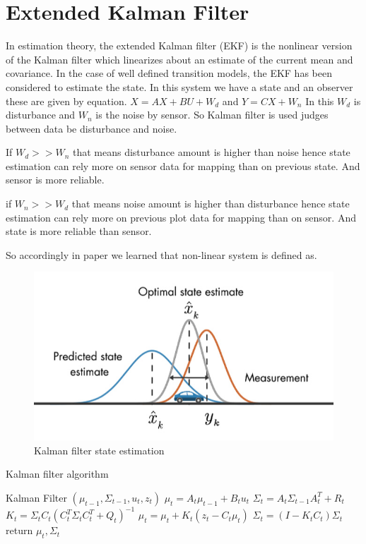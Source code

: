 \section{Extended Kalman Filter}
\label{ekf_section}

In estimation theory, the extended Kalman filter (EKF) is the nonlinear version of the Kalman filter which linearizes about an estimate of the current mean and covariance. In the case of well defined transition models, the EKF has been considered to estimate the state. In this system we have a state and an observer these are given by equation.
$ X=AX +BU + W_d $  and $ Y=CX + W_n $
In this $ W_d $ is disturbance and $ W_n $ is the noise by sensor.
So Kalman filter is used judges between data be disturbance and noise.


If $W_d >> W_n$ that means disturbance amount is higher than noise hence state estimation can rely more on sensor data for mapping than on previous state. And sensor is more reliable.

if $W_n >> W_d$ that means noise amount is higher than disturbance hence state estimation can rely more on previous plot data for mapping than on sensor. And state is more reliable than sensor.

So accordingly in paper we learned that non-linear system is defined as.

\begin{figure}[!htb]
\includegraphics[width=\textwidth]{./figures/EKF.jpg}
\caption{Kalman filter state estimation~\cite{ByBo2015} }
\end{figure}

\begin{algorithm}
\caption{Kalman filter algorithm}\label{alg-gd}
\begin{algorithmic}[1]
\STATE Kalman Filter \({(\mu_{t-1},\Sigma_{t-1},u_t,z_t)}\)
\STATE \( {\mu_{t}}=A_t \mu_{t-1} + B_t u_t \)
\STATE \( \Sigma_{t}=A_t \Sigma_{t-1} A_t^T +R_t\)
\STATE \( K_t = \Sigma_{t} C_t(C_t^T \Sigma_{t}C_t^T+Q_t)^{-1}\)
\STATE \( \mu_{t}=\mu_{t}+K_t(z_t-C_t \mu_t) \)
\STATE \(\Sigma_{t}=(I-K_t C_t)\Sigma_{t}\)
\STATE return \( \mu_t ,  \Sigma_t \)
\end{algorithmic}
\end{algorithm}

